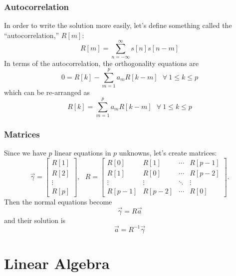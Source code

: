 \documentclass{beamer}
\begin{document}
\begin{frame}
  \frametitle{Autocorrelation}

  In order to write the solution more easily, let's define something
  called the ``autocorrelation,'' $R[m]$:
  \begin{displaymath}
    R[m] = \sum_{n=-\infty}^\infty s[n]s[n-m]
  \end{displaymath}
  In terms of the autocorrelation, the orthogonality equations are
  \begin{displaymath}
    0 = R[k] -\sum_{m=1}^pa_m R[k-m]~~~\forall~1\le k\le p
  \end{displaymath}
  which can be re-arranged as
  \begin{displaymath}
    R[k] = \sum_{m=1}^pa_m R[k-m]~~~\forall~1\le k\le p
  \end{displaymath}
\end{frame}

\begin{frame}
  \frametitle{Matrices}

  Since we have $p$ linear equations in $p$ unknowns, let's create matrices:
  \begin{displaymath}
    \vec\gamma = \left[\begin{array}{c}R[1]\\ R[2]\\\vdots\\ R[p]\end{array}\right],~~~
    R = \left[\begin{array}{cccc} R[0] & R[1] &  \cdots & R[p-1] \\
        R[1] & R[0] & \cdots & R[p-2] \\
        \vdots & \vdots & \ddots & \vdots \\
        R[p-1] & R[p-2] & \cdots & R[0] \end{array}\right].
  \end{displaymath}
  Then the normal equations become
  \begin{displaymath}
    \vec\gamma = R \vec{a}
  \end{displaymath}
  and their solution is
  \begin{displaymath}
    \vec{a} = R^{-1} \vec\gamma
  \end{displaymath}  
\end{frame}


\section[Linear Algebra]{Linear Algebra}
\setcounter{subsection}{1}
\end{document}
